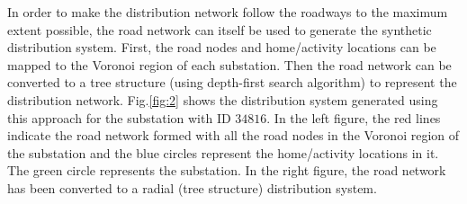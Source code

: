 \documentclass[12pt]{amsart}
\theoremstyle{definition}
\theoremstyle{remark} \newtheorem{remark}[theorem]{Remark} %
\numberwithin{equation}{section} %
\begin{document}
	In order to make the distribution network follow the roadways to the maximum extent possible, the road network can itself be used to generate the synthetic distribution system. First, the road nodes and home/activity locations can be mapped to the Voronoi region of each substation. Then the road network can be converted to a tree structure (using depth-first search algorithm) to represent the distribution network. Fig.\ref{fig:2} shows the distribution system generated using this approach for the substation with ID $34816$. In the left figure, the red lines indicate the road network formed with all the road nodes in the Voronoi region of the substation and the blue circles represent the home/activity locations in it. The green circle represents the substation. In the right figure, the road network has been converted to a radial (tree structure) distribution system.
\end{document}
